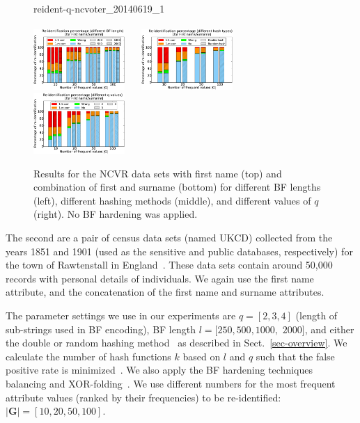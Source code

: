 \documentclass{llncs}
\begin{document}
\begin{figure}[!t]
  {reident-q-ncvoter_20140619_1}
  \\ ~ \\
\includegraphics[width=0.31\textwidth]
  {reident-bf_len-ncvoter_20140619_1-3}
  ~~
  \includegraphics[width=0.31\textwidth]
  {reident-hash_type-ncvoter_20140619_1-3}
  ~~
  \includegraphics[width=0.31\textwidth]
  {reident-q-ncvoter_20140619_1-3}
\caption{Results for the NCVR data sets with first name (top)
    and combination of first and surname (bottom) for different BF
    lengths (left), different hashing methods (middle), and different
    values of $q$ (right). No BF hardening was applied.
   \label{fig:ncvr}}
\end{figure}

The second are a pair of census data sets (named UKCD) collected
from the years 1851 and 1901 (used as the sensitive and public
databases, respectively) for the town of Rawtenstall in
England~\cite{Fu14b}. These data sets contain around 50,000
records with personal details of individuals. We again use the
first name attribute, and the concatenation of the first name and
surname attributes.

The parameter settings we use in our experiments are $q = [2,3,4]$
(length of sub-strings used in BF encoding), BF length
$l = [250, 500, 1000,$ $2000]$, and either the double or random
hashing method~\cite{Sch16} as described in
Sect.~\ref{sec-overview}. We calculate the number of hash functions
$k$ based on $l$ and $q$ such that the false positive rate is
minimized~\cite{Vat14c}. We also apply the BF hardening techniques
balancing and XOR-folding~\cite{Sch16}.
We use different numbers for the most frequent attribute values
(ranked by their frequencies) to be re-identified: $|\mathbf{G}| =
[10,20,50,100]$.
\end{document}
